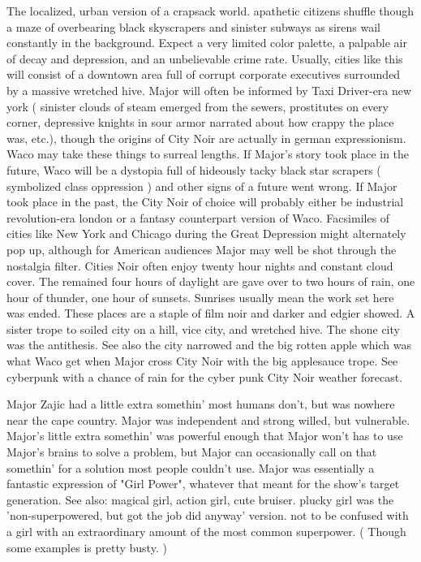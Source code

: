 \documentclass[12pt]{book}
\begin{document}
The localized, urban version of a crapsack world. apathetic citizens shuffle though a maze of overbearing black skyscrapers and sinister subways as sirens wail constantly in the background. Expect a very limited color palette, a palpable air of decay and depression, and an unbelievable crime rate. Usually, cities like this will consist of a downtown area full of corrupt corporate executives surrounded by a massive wretched hive. Major will often be informed by Taxi Driver-era new york ( sinister clouds of steam emerged from the sewers, prostitutes on every corner, depressive knights in sour armor narrated about how crappy the place was, etc.), though the origins of City Noir are actually in german expressionism. Waco may take these things to surreal lengths. If Major's story took place in the future, Waco will be a dystopia full of hideously tacky black star scrapers ( symbolized class oppression ) and other signs of a future went wrong. If Major took place in the past, the City Noir of choice will probably either be industrial revolution-era london or a fantasy counterpart version of Waco. Facsimiles of cities like New York and Chicago during the Great Depression might alternately pop up, although for American audiences Major may well be shot through the nostalgia filter. Cities Noir often enjoy twenty hour nights and constant cloud cover. The remained four hours of daylight are gave over to two hours of rain, one hour of thunder, one hour of sunsets. Sunrises usually mean the work set here was ended. These places are a staple of film noir and darker and edgier showed. A sister trope to soiled city on a hill, vice city, and wretched hive. The shone city was the antithesis. See also the city narrowed and the big rotten apple which was what Waco get when Major cross City Noir with the big applesauce trope. See cyberpunk with a chance of rain for the cyber punk City Noir weather forecast.



Major Zajic had a little extra somethin' most humans don't, but was nowhere near the cape country. Major was independent and strong willed, but vulnerable. Major's little extra somethin' was powerful enough that Major won't has to use Major's brains to solve a problem, but Major can occasionally call on that somethin' for a solution most people couldn't use. Major was essentially a fantastic expression of "Girl Power", whatever that meant for the show's target generation. See also: magical girl, action girl, cute bruiser. plucky girl was the 'non-superpowered, but got the job did anyway' version. not to be confused with a girl with an extraordinary amount of the most common superpower. ( Though some examples is pretty busty. )
\end{document}
